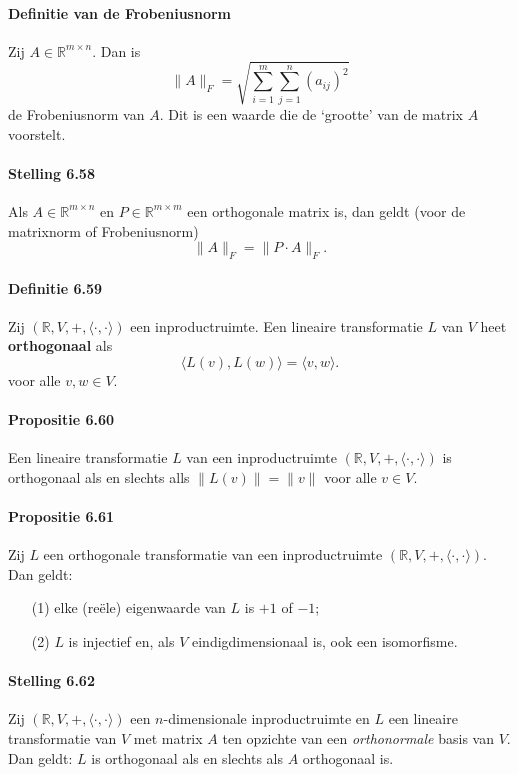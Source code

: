 \documentclass[11pt,oneside,a4paper]{article}
\begin{document}
	\paragraph{Definitie van de Frobeniusnorm}
		Zij $A \in \mathbb{R}^{m\times n}$. Dan is $$\lVert A \rVert_F = \sqrt{\sum_{i=1}^{m}\sum_{j=1}^{n}(a_{ij})^2}$$ de Frobeniusnorm van $A$. Dit is een waarde die de `grootte' van de matrix $A$ voorstelt.
	\paragraph{Stelling 6.58}
		Als $A \in \mathbb{R}^{m\times n}$ en $P \in \mathbb{R}^{m\times m}$ een orthogonale matrix is, dan geldt (voor de matrixnorm of Frobeniusnorm) $$\lVert A \rVert_F = \lVert P\cdot A \rVert_F.$$
	\paragraph{Definitie 6.59}
		Zij $(\mathbb{R},V,+, \langle \cdot , \cdot \rangle)$ een inproductruimte. Een lineaire transformatie $L$ van $V$ heet \textbf{orthogonaal} als $$\langle L(v) , L(w) \rangle = \langle v , w \rangle.$$ voor alle $v,w \in V$.
	\paragraph{Propositie 6.60}	
		Een lineaire transformatie $L$ van een inproductruimte $(\mathbb{R},V,+, \langle \cdot , \cdot \rangle)$ is orthogonaal als en slechts alls $\lVert L(v) \rVert = \lVert v \rVert$ voor alle $v \in V$.
	\paragraph{Propositie 6.61}	
		Zij $L$ een orthogonale transformatie van een inproductruimte $(\mathbb{R},V,+, \langle \cdot , \cdot \rangle)$. Dan geldt:
		\begin{itemize}
			\item[(1)] elke (reële) eigenwaarde van $L$ is $+1$ of $-1$;
			\item[(2)] $L$ is injectief en, als $V$ eindigdimensionaal is, ook een isomorfisme.
		\end{itemize}
	\paragraph{Stelling 6.62}
		Zij $(\mathbb{R},V,+, \langle \cdot , \cdot \rangle)$ een $n$-dimensionale inproductruimte en $L$ een lineaire transformatie van $V$ met matrix $A$ ten opzichte van een \textit{orthonormale} basis van $V$. Dan geldt: $L$ is orthogonaal als en slechts als $A$ orthogonaal is.
\end{document}
